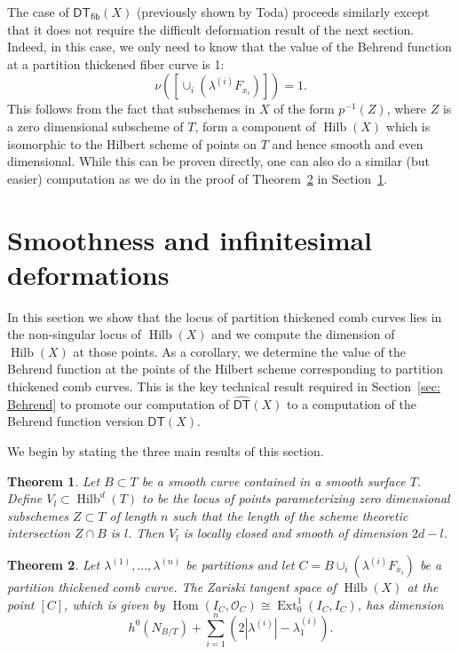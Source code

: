 \documentclass[12pt]{amsart}
\newtheorem{theorem}{Theorem}%
\theoremstyle{definition}
\renewcommand{\O}{\mathcal{O}}
\newcommand{\Hom}{\operatorname{Hom}}
\newcommand{\Ext}{\operatorname{Ext}}
\newcommand{\Hilb}{\operatorname{Hilb}}
\newcommand{\DT}{\mathsf{DT}}
\newcommand{\DThat}{\widehat{\DT}}
\newcommand{\fiber}{\mathsf{fib}}
\begin{document}
The case of $\DT_{\fiber}(X)$ (previously shown by Toda) proceeds
similarly except that it does not require the difficult deformation
result of the next section. Indeed, in this case, we only need to know
that the value of the Behrend function at a partition thickened fiber
curve is 1:
\[
\nu \left(\left[ \cup_{i} \left(\lambda^{(i)}F_{x_{i}} \right) \right]
\right) =1.
\]
This follows from the fact that subschemes in $X$ of the form
$p^{-1}(Z)$, where $Z$ is a zero dimensional subscheme of $T$, form a
component of $\Hilb (X)$ which is isomorphic to the Hilbert scheme of
points on $T$ and hence smooth and even dimensional. While this can be
proven directly, one can also do a similar (but easier) computation as
we do in the proof of Theorem~\ref{thm: Ext computation} in
Section~\ref{sec: smoothness and deformations}.



\section{Smoothness and infinitesimal deformations}\label{sec: smoothness and deformations}


In this section we show that the locus of partition thickened comb
curves lies in the non-singular locus of $\Hilb (X)$ and we compute
the dimension of $\Hilb (X)$ at those points. As a corollary, we
determine the value of the Behrend function at the points of the
Hilbert scheme corresponding to partition thickened comb curves. This
is the key technical result required in Section~\ref{sec: Behrend} to
promote our computation of $\DThat (X)$ to a computation of the
Behrend function version $\DT (X)$.


We begin by stating the three main results of this section.

\begin{theorem}\label{thm: strata of Hilb(C^2) with fixed intersection
is smooth} Let $B\subset T$ be a smooth curve contained in a smooth
surface $T$. Define $V_{l}\subset \Hilb^{d}(T)$ to be the locus of
points parameterizing zero dimensional subschemes $Z\subset T$ of length
$n$ such that the length of the scheme theoretic intersection $Z\cap
B$ is $l$. Then $V_{l}$ is locally closed and smooth of dimension
$2d-l$.
\end{theorem}

\begin{theorem}\label{thm: Ext computation}
Let $\lambda^{(1)},\dotsc ,\lambda^{(n)}$ be partitions and let
$C=B\cup_{i}\left(\lambda^{(i)}F_{x_{i}} \right)$ be a partition
thickened comb curve. The Zariski tangent space of $\Hilb (X)$ at
the point $[C]$, which is given by $\Hom (I_{C},\O_{C})\cong
\Ext^{1}_{0}(I_{C},I_{C})$, has dimension
\[
h^{0}(N_{B/T}) + \sum_{i=1}^{n}\left(2|\lambda^{(i)}| - \lambda_{1}^{(i)} \right).
\]
\end{theorem}
\end{document}
